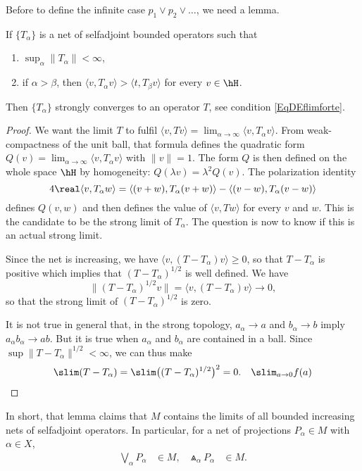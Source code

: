 Before to define the infinite case $p_1\vee p_2\vee\ldots$, we need a lemma.

\begin{lemma}
If $\{ T_{\alpha} \}$ is a net of selfadjoint bounded operators such that
\begin{enumerate}
\item $\sup_{\alpha}\| T_{\alpha} \|<\infty$,
\item if $\alpha >\beta$, then $\langle v, T_{\alpha} v\rangle >\langle t, T_{\beta} v\rangle $ for every $v\in\hH$.
\end{enumerate}
Then $\{ T_{\alpha} \}$ strongly converges to an operator $T$, see condition \eqref{EqDEflimforte}.
\end{lemma}

\begin{proof}
We want the limit $T$ to fulfil $\langle v, Tv\rangle =\lim_{\alpha\to\infty}\langle v, T_{\alpha} v\rangle$. From weak-compactness of the unit ball, that formula defines the quadratic form $Q(v)=\lim_{\alpha\to\infty}\langle v, T_{\alpha} v\rangle $ with $\| v \|=1$. The form $Q$ is then defined on the whole space $\hH$ by homogeneity: $Q(\lambda v)=\lambda^2 Q(v)$. The polarization identity
\[ 
  4\real\langle v, T_{\alpha} w\rangle =\langle (v+w), T_{\alpha}(v+w)\rangle -\langle (v-w), T_{\alpha}(v-w)\rangle 
\]
defines $Q(v,w)$ and then defines the value of $\langle v, Tw\rangle $ for every $v$ and $w$. This is the candidate to be the strong limit of $T_{\alpha}$. The question is now to know if this is an actual strong limit.

Since the net is increasing, we have $\langle v, (T-T_{\alpha})v\rangle \geq0$, so that $T-T_{\alpha}$ is positive which implies that $(T-T_{\alpha})^{1/2}$ is well defined. We have
\[ 
  \| (T-T_{\alpha})^{1/2}v \|=\langle v, (T-T_{\alpha})v\rangle \to 0,
\]
so that the strong limit of $(T-T_{\alpha})^{1/2}$ is zero. 

It is not true in general that, in the strong topology, $a_{\alpha}\to a$ and $b_{\alpha}\to b$ imply $a_{\alpha} b_{\alpha}\to ab$. But it is true when $a_{\alpha}$ and $b_{\alpha}$ are contained in a ball. Since $\sup \| T-T_{\alpha} \|^{1/2}<\infty$, we can thus make
\[ 
  \slim(T-T_{\alpha})=\slim\big( (T-T_{\alpha})^{1/2} \big)^2=0.\quad \slim_{a\to 0}f(a)
\]
\end{proof}
In short, that lemma claims that $M$ contains the limits of all bounded increasing nets of selfadjoint operators. In particular, for a net of projections $P_{\alpha}\in M$ with $\alpha\in X$,
\begin{align*}
	\bigvee_{\alpha}P_{\alpha}&\in M,&
	\Wedge_{\alpha}P_{\alpha}&\in M.
\end{align*}

